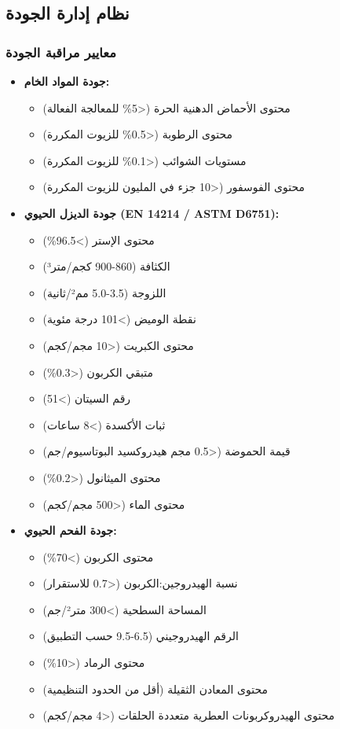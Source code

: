 \subsection{نظام إدارة الجودة}

\subsubsection{معايير مراقبة الجودة}
\begin{itemize}
    \item \textbf{جودة المواد الخام:}
    \begin{itemize}
        \item محتوى الأحماض الدهنية الحرة (<5\% للمعالجة الفعالة)
        \item محتوى الرطوبة (<0.5\% للزيوت المكررة)
        \item مستويات الشوائب (<0.1\% للزيوت المكررة)
        \item محتوى الفوسفور (<10 جزء في المليون للزيوت المكررة)
    \end{itemize}
    
    \item \textbf{جودة الديزل الحيوي (EN 14214 / ASTM D6751):}
    \begin{itemize}
        \item محتوى الإستر (>96.5\%)
        \item الكثافة (860-900 كجم/متر³)
        \item اللزوجة (3.5-5.0 مم²/ثانية)
        \item نقطة الوميض (>101 درجة مئوية)
        \item محتوى الكبريت (<10 مجم/كجم)
        \item متبقي الكربون (<0.3\%)
        \item رقم السيتان (>51)
        \item ثبات الأكسدة (>8 ساعات)
        \item قيمة الحموضة (<0.5 مجم هيدروكسيد البوتاسيوم/جم)
        \item محتوى الميثانول (<0.2\%)
        \item محتوى الماء (<500 مجم/كجم)
    \end{itemize}
    
    \item \textbf{جودة الفحم الحيوي:}
    \begin{itemize}
        \item محتوى الكربون (>70\%)
        \item نسبة الهيدروجين:الكربون (<0.7 للاستقرار)
        \item المساحة السطحية (>300 متر²/جم)
        \item الرقم الهيدروجيني (6.5-9.5 حسب التطبيق)
        \item محتوى الرماد (<10\%)
        \item محتوى المعادن الثقيلة (أقل من الحدود التنظيمية)
        \item محتوى الهيدروكربونات العطرية متعددة الحلقات (<4 مجم/كجم)
    \end{itemize}
\end{itemize}

